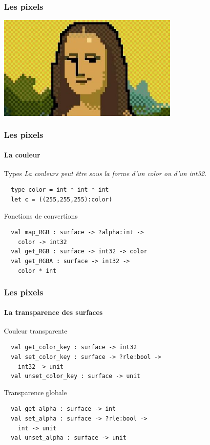 \begin{frame}
	\frametitle{Les pixels}
	\begin{center}
		\includegraphics[width=9cm]{pics/Joconde-pixel.jpg}
	\end{center}
\end{frame}

\begin{frame}[fragile]
	\frametitle{Les pixels}
	\framesubtitle{La couleur}
	\begin{block}{Types}
		\textit{La couleurs peut être sous la forme d'un color ou d'un int32.}
		\begin{lstlisting}
  type color = int * int * int
  let c = ((255,255,255):color)
		\end{lstlisting}
	\end{block}
	\begin{block}{Fonctions de convertions}
		\begin{lstlisting}
  val map_RGB : surface -> ?alpha:int -> 
    color -> int32
  val get_RGB : surface -> int32 -> color
  val get_RGBA : surface -> int32 -> 
    color * int
		\end{lstlisting}
	\end{block}
\end{frame}

\begin{frame}[fragile]
	\frametitle{Les pixels}
	\framesubtitle{La transparence des surfaces}
	\begin{block}{Couleur transparente}
		\begin{lstlisting}
  val get_color_key : surface -> int32
  val set_color_key : surface -> ?rle:bool -> 
    int32 -> unit
  val unset_color_key : surface -> unit
		\end{lstlisting}
	\end{block}
	\begin{block}{Transparence globale}
		\begin{lstlisting}
  val get_alpha : surface -> int
  val set_alpha : surface -> ?rle:bool -> 
    int -> unit
  val unset_alpha : surface -> unit
		\end{lstlisting}
	\end{block}
\end{frame}

